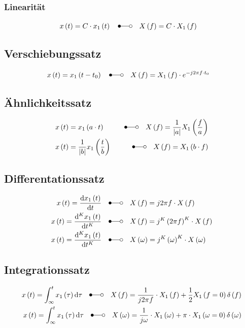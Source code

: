 \subsubsection*{Linearität}
\begin{align*}
x\left(t\right) &=C\cdot x_1\left(t\right)\quad \Laplace \quad X\left(f\right) =C\cdot
X_1\left(f\right)
\end{align*}

\subsection*{Verschiebungssatz}
\begin{align*}
x\left(t\right) &=x_1\left(t-t_0\right)\quad \Laplace \quad X\left(f\right) =X_1\left(f\right)\cdot
e^{-j2\pi f\cdot t_0}
\end{align*}

\subsection*{Ähnlichkeitssatz}
\begin{align*}
x\left(t\right) &=x_1\left(a\cdot t\right)\quad &\Laplace \quad X\left(f\right)
=\frac{1}{\left|a\right|}X_1\left(\frac{f}{a}\right)\\
x\left(t\right) &=\frac{1}{\left|b\right|}x_1\left(\frac{t}{b}\right) \quad &\Laplace \quad
X\left(f\right) =X_1\left(b\cdot f\right)
\end{align*}

\subsection*{Differentationssatz}
\begin{align*}
x\left(t\right) =\frac{\diff x_1\left(t\right)}{\diff t} \quad &\Laplace \quad X\left(f\right)
=j2\pi f\cdot X\left(f\right)\\
x\left(t\right) =\frac{\diff^K x_1\left(t\right)}{\diff t^K} \quad &\Laplace \quad X\left(f\right)
=j^K\left(2\pi f\right)^K\cdot X\left(f\right)\\
x\left(t\right) =\frac{\diff^K x_1\left(t\right)}{\diff t^K} \quad &\Laplace \quad
X\left(\omega\right) =j^K\left(\omega\right)^K\cdot X\left(\omega\right)
\end{align*}

\subsection*{Integrationssatz}
\begin{align*}
x\left(t\right) =\int_\infty^tx_1\left(\tau\right)\diff\tau \quad \Laplace \quad X\left(f\right) =\frac{1}{j2\pi f}\cdot X_1\left(f\right)+\frac{1}{2}X_1\left(f=0\right)\delta\left(f\right)\\
x\left(t\right) =\int_\infty^tx_1\left(\tau\right)\diff\tau \quad \Laplace \quad X\left(\omega\right) =\frac{1}{j \omega}\cdot X_1\left(\omega\right)+\pi\cdot X_1\left(\omega=0\right)\delta\left(\omega\right)
\end{align*}

